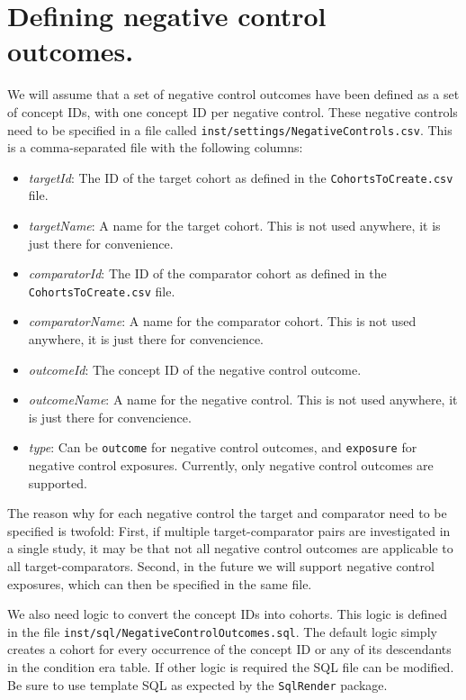 \documentclass[
]{article}
\providecommand{\tightlist}{%
  \setlength{\itemsep}{0pt}\setlength{\parskip}{0pt}}
\begin{document}
\hypertarget{defining-negative-control-outcomes.}{%
\section{Defining negative control
outcomes.}\label{defining-negative-control-outcomes.}}

We will assume that a set of negative control outcomes have been defined
as a set of concept IDs, with one concept ID per negative control. These
negative controls need to be specified in a file called
\texttt{inst/settings/NegativeControls.csv}. This is a comma-separated
file with the following columns:

\begin{itemize}
\tightlist
\item
  \emph{targetId}: The ID of the target cohort as defined in the
  \texttt{CohortsToCreate.csv} file.
\item
  \emph{targetName}: A name for the target cohort. This is not used
  anywhere, it is just there for convenience.
\item
  \emph{comparatorId}: The ID of the comparator cohort as defined in the
  \texttt{CohortsToCreate.csv} file.
\item
  \emph{comparatorName}: A name for the comparator cohort. This is not
  used anywhere, it is just there for convencience.
\item
  \emph{outcomeId}: The concept ID of the negative control outcome.
\item
  \emph{outcomeName}: A name for the negative control. This is not used
  anywhere, it is just there for convencience.
\item
  \emph{type}: Can be \texttt{outcome} for negative control outcomes,
  and \texttt{exposure} for negative control exposures. Currently, only
  negative control outcomes are supported.
\end{itemize}

The reason why for each negative control the target and comparator need
to be specified is twofold: First, if multiple target-comparator pairs
are investigated in a single study, it may be that not all negative
control outcomes are applicable to all target-comparators. Second, in
the future we will support negative control exposures, which can then be
specified in the same file.

We also need logic to convert the concept IDs into cohorts. This logic
is defined in the file \texttt{inst/sql/NegativeControlOutcomes.sql}.
The default logic simply creates a cohort for every occurrence of the
concept ID or any of its descendants in the condition era table. If
other logic is required the SQL file can be modified. Be sure to use
template SQL as expected by the \texttt{SqlRender} package.
\end{document}
